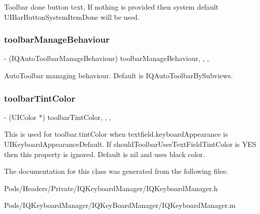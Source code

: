 Toolbar done button text, If nothing is provided then system default \textquotesingle{}U\+I\+Bar\+Button\+System\+Item\+Done\textquotesingle{} will be used. \mbox{\label{interface_i_q_keyboard_manager_a24f41d535c99522e3f2a03f97f061364}} 
\subsubsection{\texorpdfstring{toolbar\+Manage\+Behaviour}{toolbarManageBehaviour}}
{\footnotesize\ttfamily -\/ (I\+Q\+Auto\+Toolbar\+Manage\+Behaviour) toolbar\+Manage\+Behaviour\hspace{0.3cm}{\ttfamily [read]}, {\ttfamily [write]}, {\ttfamily [nonatomic]}, {\ttfamily [assign]}}

Auto\+Toolbar managing behaviour. Default is I\+Q\+Auto\+Toolbar\+By\+Subviews. \mbox{\label{interface_i_q_keyboard_manager_a4302c19748017c4ae58f83f04fd84d1f}} 
\subsubsection{\texorpdfstring{toolbar\+Tint\+Color}{toolbarTintColor}}
{\footnotesize\ttfamily -\/ (U\+I\+Color $\ast$) toolbar\+Tint\+Color\hspace{0.3cm}{\ttfamily [read]}, {\ttfamily [write]}, {\ttfamily [nonatomic]}, {\ttfamily [strong]}}

This is used for toolbar.\+tint\+Color when textfield.\+keyboard\+Appearance is U\+I\+Keyboard\+Appearance\+Default. If should\+Toolbar\+Uses\+Text\+Field\+Tint\+Color is Y\+ES then this property is ignored. Default is nil and uses black color. 

The documentation for this class was generated from the following files\+:\begin{DoxyCompactItemize}
\item 
Pods/\+Headers/\+Private/\+I\+Q\+Keyboard\+Manager/I\+Q\+Keyboard\+Manager.\+h\item 
Pods/\+I\+Q\+Keyboard\+Manager/\+I\+Q\+Key\+Board\+Manager/I\+Q\+Keyboard\+Manager.\+m\end{DoxyCompactItemize}
